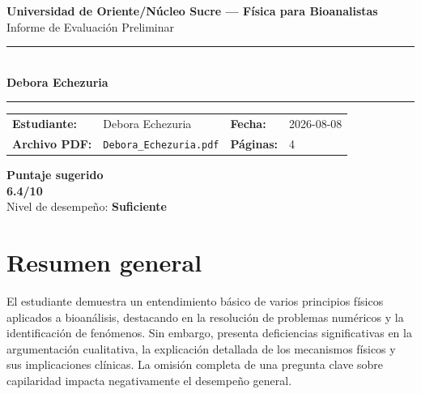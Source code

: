 \documentclass[11pt,a4paper]{article}
\begin{document}
\begin{center}
  {\Large\bfseries\color{azulTitulo} Universidad de Oriente/Núcleo Sucre --- Física para Bioanalistas}\\[4pt]
  {\large Informe de Evaluación Preliminar}\\[12pt]
  \rule{\linewidth}{1.2pt}\\[6pt]
  {\LARGE\bfseries Debora Echezuria}\\[4pt]
  \rule{\linewidth}{0.6pt}
\end{center}

\vspace{4pt}
\begin{tcolorbox}[cajaTitulo, title=Datos del informe]
\begin{tabular}{@{}llll@{}}
  \textbf{Estudiante:}  & Debora Echezuria  &
  \textbf{Fecha:}       & 2026-08-08 \\[4pt]
  \textbf{Archivo PDF:} & \texttt{Debora\_Echezuria.pdf}  &
  \textbf{Páginas:}     & 4 \\
\end{tabular}
\end{tcolorbox}

\vspace{6pt}
\begin{center}
  \begin{tcolorbox}[
    enhanced,
    colback=white, colframe=desempeno_suficiente,
    width=0.62\linewidth,
    boxrule=2pt,
    halign=center, valign=center,
    top=8pt, bottom=8pt,
  ]
    \centering
    {\large\bfseries Puntaje sugerido}\\[6pt]
    {\Huge\bfseries\color{desempeno_suficiente} 6.4/10}\\[6pt]
    {\large Nivel de desempeño: \textbf{\color{desempeno_suficiente} Suficiente}}
  \end{tcolorbox}
\end{center}

\section*{Resumen general}
El estudiante demuestra un entendimiento básico de varios principios físicos aplicados a bioanálisis, destacando en la resolución de problemas numéricos y la identificación de fenómenos. Sin embargo, presenta deficiencias significativas en la argumentación cualitativa, la explicación detallada de los mecanismos físicos y sus implicaciones clínicas. La omisión completa de una pregunta clave sobre capilaridad impacta negativamente el desempeño general.
\end{document}
